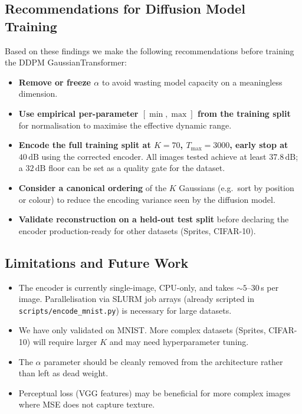 \subsection{Recommendations for Diffusion Model Training}

Based on these findings we make the following recommendations before training the
DDPM GaussianTransformer:

\begin{itemize}[leftmargin=2em]
  \item \textbf{Remove or freeze $\alpha$} to avoid wasting model capacity on a
        meaningless dimension.
  \item \textbf{Use empirical per-parameter $[\min, \max]$ from the training split}
        for normalisation to maximise the effective dynamic range.
  \item \textbf{Encode the full training split at $K=70$, $T_\text{max}=3000$,
        early stop at $40\,\text{dB}$} using the corrected encoder.  All images
        tested achieve at least $37.8\,\text{dB}$; a $32\,\text{dB}$ floor can
        be set as a quality gate for the dataset.
  \item \textbf{Consider a canonical ordering} of the $K$ Gaussians
        (e.g.\ sort by position or colour) to reduce the encoding variance seen
        by the diffusion model.
  \item \textbf{Validate reconstruction on a held-out test split} before declaring
        the encoder production-ready for other datasets (Sprites, CIFAR-10).
\end{itemize}

\subsection{Limitations and Future Work}

\begin{itemize}[leftmargin=2em]
  \item The encoder is currently single-image, CPU-only, and takes ${\sim}5$--$30$\,s
        per image.  Parallelisation via SLURM job arrays (already scripted in
        \texttt{scripts/encode\_mnist.py}) is necessary for large datasets.
  \item We have only validated on MNIST.  More complex datasets (Sprites, CIFAR-10)
        will require larger $K$ and may need hyperparameter tuning.
  \item The $\alpha$ parameter should be cleanly removed from the architecture
        rather than left as dead weight.
  \item Perceptual loss (VGG features) may be beneficial for more complex images
        where MSE does not capture texture.
\end{itemize}
